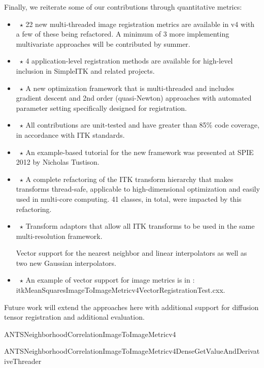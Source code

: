 \documentclass{frontiersSCNS}
\begin{document}
Finally, we reiterate some of our contributions through quantitative metrics:
\begin{itemize}
\item~$\star$ 22 new multi-threaded image registration metrics are available in v4 with a few of these being refactored. A minimum of 3 more implementing multivariate approaches will be contributed by summer.

\item~$\star$ 4 application-level registration methods are available for high-level inclusion in SimpleITK and related projects.

\item~$\star$ A new optimization framework that is multi-threaded and includes gradient descent and 2nd order (quasi-Newton) approaches with automated parameter setting specifically designed for registration.

\item~$\star$ All contributions are unit-tested and have greater than 85\% code coverage, in accordance with ITK standards.

\item~$\star$ An example-based tutorial for the new framework was presented at SPIE 2012 by Nicholas Tustison.

\item~$\star$ A complete refactoring of the ITK transform hierarchy that makes transforms thread-safe, applicable to high-dimensional optimization and easily used in multi-core computing. 41 classes, in total, were impacted by this refactoring.

\item~$\star$ Transform adaptors that allow all ITK transforms to be used in the same multi-resolution framework. 

Vector support for the nearest neighbor and linear interpolators as well as two new Gaussian interpolators.

\item~$\star$ An example of vector support for image metrics is in : itkMeanSquaresImageToImageMetricv4VectorRegistrationTest.cxx.
\end{itemize}

Future work will extend the approaches here with additional support
for diffusion tensor registration and additional evaluation.



ANTSNeighborhoodCorrelationImageToImageMetricv4

ANTSNeighborhoodCorrelationImageToImageMetricv4DenseGetValueAndDerivativeThreader
\end{document}
